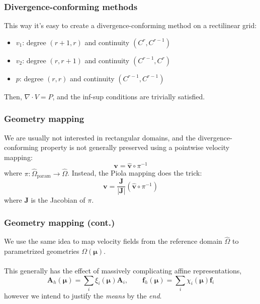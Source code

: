 \documentclass{beamer}
\begin{document}
\begin{frame}
  \frametitle{Divergence-conforming methods}

  This way it's easy to create a divergence-conforming method on a
  rectilinear grid:

  \begin{itemize}
  \item $v_1$: degree $(r+1,r)$ and continuity $(C^r, C^{r-1})$
  \item $v_2$: degree $(r,r+1)$ and continuity $(C^{r-1}, C^r)$
  \item $p$: degree $(r,r)$ and continuity $(C^{r-1}, C^{r-1})$
  \end{itemize}

  Then, $\nabla \cdot V = P$, and the inf-sup conditions are trivially satisfied.
\end{frame}

\begin{frame}
  \frametitle{Geometry mapping}

  We are usually not interested in rectangular domains, and the divergence-conforming property is
  not generally preserved using a pointwise velocity mapping:
  \[
    \bm v = \hat{\bm v} \circ \pi^{-1}
  \]
  where $\pi : \hat{\Omega}_{\text{param}} \to \hat{\Omega}$. Instead, the Piola mapping does the trick:
  \[
    \bm v = \frac{\bm J}{|\bm J|} (\hat{\bm v} \circ \pi^{-1})
  \]
  where $\bm J$ is the Jacobian of $\pi$.
\end{frame}

\begin{frame}
  \frametitle{Geometry mapping (cont.)}

  We use the same idea to map velocity fields from the reference domain $\hat{\Omega}$ to
  parametrized geometries $\Omega(\bm \mu)$.
  \\~\\
  This generally has the effect of massively complicating affine representations,
  \[
    \bm A_h(\bm \mu) = \textstyle \sum_i \xi_i(\bm \mu) \bm A_i, \qquad
    \bm f_h(\bm \mu) = \textstyle \sum_i \chi_i(\bm \mu) \bm f_i
  \]
  however we intend to justify the \emph{means} by the \emph{end}.
\end{frame}
\end{document}
